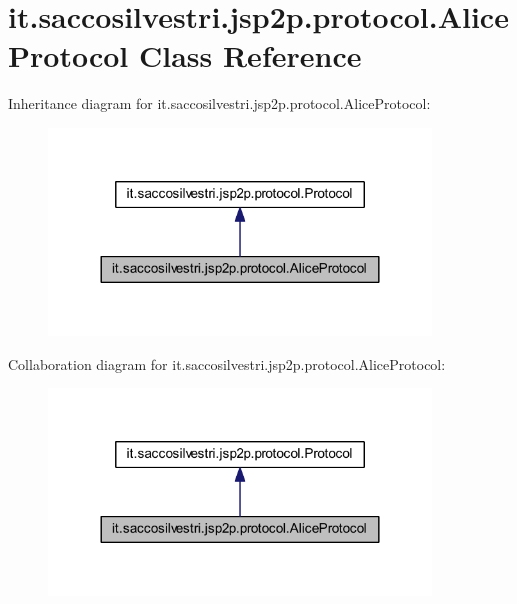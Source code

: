 \hypertarget{classit_1_1saccosilvestri_1_1jsp2p_1_1protocol_1_1_alice_protocol}{
\section{it.saccosilvestri.jsp2p.protocol.\-Alice\-Protocol \-Class \-Reference}
\label{classit_1_1saccosilvestri_1_1jsp2p_1_1protocol_1_1_alice_protocol}
}


\-Inheritance diagram for it.saccosilvestri.jsp2p.protocol.\-Alice\-Protocol\-:
\nopagebreak
\begin{figure}[H]
\begin{center}
\leavevmode
\includegraphics[width=288pt]{classit_1_1saccosilvestri_1_1jsp2p_1_1protocol_1_1_alice_protocol__inherit__graph}
\end{center}
\end{figure}


\-Collaboration diagram for it.saccosilvestri.jsp2p.protocol.\-Alice\-Protocol\-:
\nopagebreak
\begin{figure}[H]
\begin{center}
\leavevmode
\includegraphics[width=288pt]{classit_1_1saccosilvestri_1_1jsp2p_1_1protocol_1_1_alice_protocol__coll__graph}
\end{center}
\end{figure}
